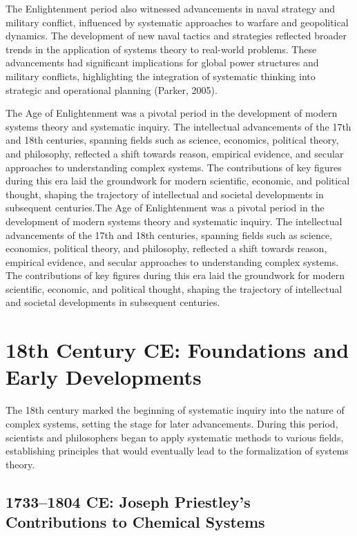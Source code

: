 \documentclass[twocolumn]{article}
\begin{document}
\textcolor{secondary}{The Enlightenment period also witnessed advancements in naval strategy and military conflict, influenced by systematic approaches to warfare and geopolitical dynamics. The development of new naval tactics and strategies reflected broader trends in the application of systems theory to real-world problems. These advancements had significant implications for global power structures and military conflicts, highlighting the integration of systematic thinking into strategic and operational planning (Parker, 2005).}

\textcolor{primary}{The Age of Enlightenment was a pivotal period in the development of modern systems theory and systematic inquiry. The intellectual advancements of the 17th and 18th centuries, spanning fields such as science, economics, political theory, and philosophy, reflected a shift towards reason, empirical evidence, and secular approaches to understanding complex systems. The contributions of key figures during this era laid the groundwork for modern scientific, economic, and political thought, shaping the trajectory of intellectual and societal developments in subsequent centuries.}The Age of Enlightenment was a pivotal period in the development of modern systems theory and systematic inquiry. The intellectual advancements of the 17th and 18th centuries, spanning fields such as science, economics, political theory, and philosophy, reflected a shift towards reason, empirical evidence, and secular approaches to understanding complex systems. The contributions of key figures during this era laid the groundwork for modern scientific, economic, and political thought, shaping the trajectory of intellectual and societal developments in subsequent centuries.

\section{18th Century CE: Foundations and Early Developments}

\textcolor{primary}{The 18th century marked the beginning of systematic inquiry into the nature of complex systems, setting the stage for later advancements. During this period, scientists and philosophers began to apply systematic methods to various fields, establishing principles that would eventually lead to the formalization of systems theory.}

\subsection{1733–1804 CE: Joseph Priestley’s Contributions to Chemical Systems}
\end{document}

